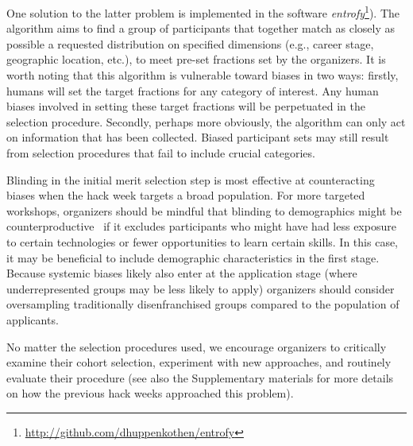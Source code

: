 One solution to the latter problem is implemented in the software \textit{entrofy}\footnote{\url{http://github.com/dhuppenkothen/entrofy}}). 
The algorithm aims to find a group of participants that together match as closely as possible a requested distribution on specified dimensions (e.g., career stage, geographic location, etc.), to meet pre-set fractions set by the organizers.
It is worth noting that this algorithm is vulnerable toward biases in two ways: firstly, humans will set the target fractions for any category of interest.  
Any human biases involved in setting these target fractions will be perpetuated in the selection procedure. 
Secondly, perhaps more obviously, the algorithm can only act on information that has been collected.
Biased participant sets may still result from selection procedures that fail to include crucial categories. 

Blinding in the initial merit selection step is most effective at counteracting biases when the hack week targets a broad population. 
For more targeted workshops, organizers should be mindful that blinding to demographics might be counterproductive~\cite{behaghel2015unintended} if it excludes participants who might have had less exposure to certain technologies or fewer opportunities to learn certain skills. 
In this case, it may be beneficial to include demographic characteristics in the first stage. 
Because systemic biases likely also enter at the application stage (where underrepresented groups may be less likely to apply) organizers should consider oversampling traditionally disenfranchised groups compared to the population of applicants. 

No matter the selection procedures used, we encourage organizers to critically examine their cohort selection, experiment with new approaches, and routinely evaluate their procedure (see also the Supplementary materials for more details on how the previous hack weeks approached this problem). 
